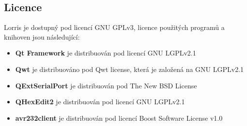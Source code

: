 \documentclass[12pt, a4paper, oneside]{article}
\begin{document}
\subsection*{Licence}
Lorris je dostupný pod licencí GNU GPLv3, licence použitých programů a knihoven jsou následující:
\begin{itemize}
    \item {\bf Qt Framework} je distribuován pod licencí GNU LGPLv2.1
    \item {\bf Qwt} je distribuováno pod Qwt license, která je založená na GNU LGPLv2.1
    \item {\bf QExtSerialPort} je distribuován pod The New BSD License
    \item {\bf QHexEdit2} je distribuován pod licencí GNU LGPLv2.1
    \item {\bf avr232client} je distribuován pod licencí Boost Software License v1.0
\end{itemize}
\end{document}
